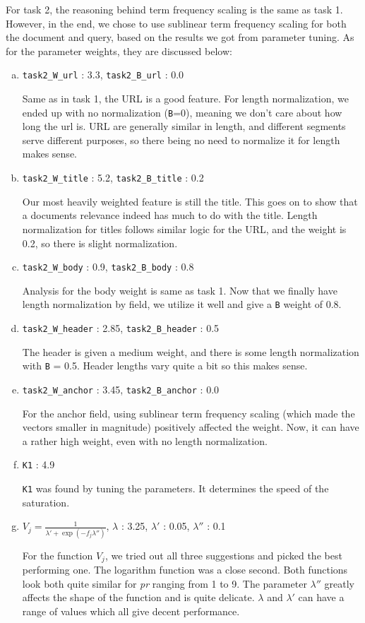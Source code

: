 \documentclass[10pt,twocolumn]{article}
\begin{document}
For task 2, the reasoning behind term frequency scaling is the same as task 1. However, in the end, we chose to use sublinear term frequency scaling for both the document and query, based on the results we got from parameter tuning. As for the parameter weights, they are discussed below:
\begin{enumerate}[(a)]
\item \texttt{task2\_W\_url} : 3.3, \texttt{task2\_B\_url} : 0.0

Same as in task 1, the URL is a good feature. For length normalization, we ended up with no normalization (\texttt{B}=0), meaning we don't care about how long the url is. URL are generally similar in length, and different segments serve different purposes, so there being no need to normalize it for length makes sense.
\item \texttt{task2\_W\_title} : 5.2, \texttt{task2\_B\_title} : 0.2

Our most heavily weighted feature is still the title. This goes on to show that a documents relevance indeed has much to do with the title. Length normalization for titles follows similar logic for the URL, and the weight is 0.2, so there is slight normalization.
\item \texttt{task2\_W\_body} : 0.9, \texttt{task2\_B\_body} : 0.8

Analysis for the body weight is same as task 1. Now that we finally have length normalization by field, we utilize it well and give a \texttt{B} weight of 0.8.
\item \texttt{task2\_W\_header} : 2.85, \texttt{task2\_B\_header} : 0.5

The header is given a medium weight, and there is some length normalization with \texttt{B} = 0.5. Header lengths vary quite a bit so this makes sense.
\item \texttt{task2\_W\_anchor} : 3.45, \texttt{task2\_B\_anchor} : 0.0

For the anchor field, using sublinear term frequency scaling (which made the vectors smaller in magnitude) positively affected the weight. Now, it can have a rather high weight, even with no length normalization.
\item \texttt{K1} : 4.9

\texttt{K1} was found by tuning the parameters. It determines the speed of the saturation.
\item $V_j = \frac{1}{\lambda'+\exp({-f_j\lambda''})}$, \texttt{$\lambda$} : 3.25, \texttt{$\lambda'$} : 0.05, \texttt{$\lambda''$} : 0.1

For the function $V_j$, we tried out all three suggestions and picked the best performing one. The logarithm function was a close second. Both functions look both quite similar for {\it pr} ranging from 1 to 9. The parameter $\lambda''$ greatly affects the shape of the function and is quite delicate. $\lambda$ and $\lambda'$ can have a range of values which all give decent performance.
\end{enumerate}
\end{document}
